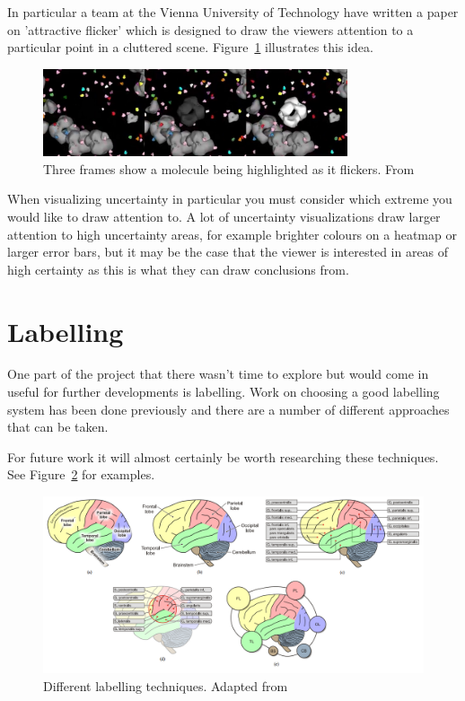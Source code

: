 In particular a team at the Vienna University of Technology have written a paper on 'attractive flicker' which is designed to draw the viewers attention to a particular point in a cluttered scene\cite{attractiveflicker}. Figure~\ref{fig:flicker} illustrates this idea.

\begin{figure}[H]
    \centering
	\includegraphics[width=0.8\textwidth]{images/background/flicker.png}
    \caption{Three frames show a molecule being highlighted as it flickers. From \cite{attractiveflicker}}
    \label{fig:flicker}
\end{figure}

When visualizing uncertainty in particular you must consider which extreme you would like to draw attention to. A lot of uncertainty visualizations draw larger attention to high uncertainty areas, for example brighter colours on a heatmap or larger error bars, but it may be the case that the viewer is interested in areas of high certainty as this is what they can draw conclusions from.

\newpage
\section{Labelling}\label{background:labelling}
One part of the project that there wasn't time to explore but would come in useful for further developments is labelling. Work on choosing a good labelling system has been done previously and there are a number of different approaches that can be taken\cite{labelling}.

For future work it will almost certainly be worth researching these techniques. See Figure~\ref{fig:labels} for examples.

\begin{figure}[H]
    \centering
	\includegraphics[width=1.0\textwidth]{images/background/labels.png}
    \caption{Different labelling techniques. Adapted from \cite{labelling}}
    \label{fig:labels}
\end{figure}